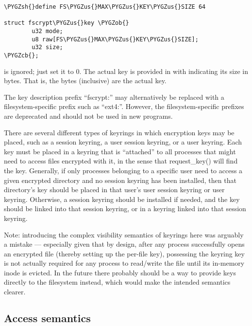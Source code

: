 \documentclass[a4paper,8pt,english]{sphinxmanual}
\def\PYGZus{\char`\_}
\def\PYGZob{\char`\{}
\def\PYGZcb{\char`\}}
\def\PYGZsh{\char`\#}
\begin{document}
\begin{Verbatim}[commandchars=\\\{\}]
\PYGZsh{}define FS\PYGZus{}MAX\PYGZus{}KEY\PYGZus{}SIZE 64

struct fscrypt\PYGZus{}key \PYGZob{}
        u32 mode;
        u8 raw[FS\PYGZus{}MAX\PYGZus{}KEY\PYGZus{}SIZE];
        u32 size;
\PYGZcb{};
\end{Verbatim}

 is ignored; just set it to 0.  The actual key is provided in
 with  indicating its size in bytes.  That is, the
bytes  (inclusive) are the actual key.

The key description prefix ``fscrypt:'' may alternatively be replaced
with a filesystem-specific prefix such as ``ext4:''.  However, the
filesystem-specific prefixes are deprecated and should not be used in
new programs.

There are several different types of keyrings in which encryption keys
may be placed, such as a session keyring, a user session keyring, or a
user keyring.  Each key must be placed in a keyring that is ``attached''
to all processes that might need to access files encrypted with it, in
the sense that request\_key() will find the key.  Generally, if only
processes belonging to a specific user need to access a given
encrypted directory and no session keyring has been installed, then
that directory's key should be placed in that user's user session
keyring or user keyring.  Otherwise, a session keyring should be
installed if needed, and the key should be linked into that session
keyring, or in a keyring linked into that session keyring.

Note: introducing the complex visibility semantics of keyrings here
was arguably a mistake --- especially given that by design, after any
process successfully opens an encrypted file (thereby setting up the
per-file key), possessing the keyring key is not actually required for
any process to read/write the file until its in-memory inode is
evicted.  In the future there probably should be a way to provide keys
directly to the filesystem instead, which would make the intended
semantics clearer.


\subsection{Access semantics}
\label{filesystems/fscrypt:access-semantics}
\end{document}
